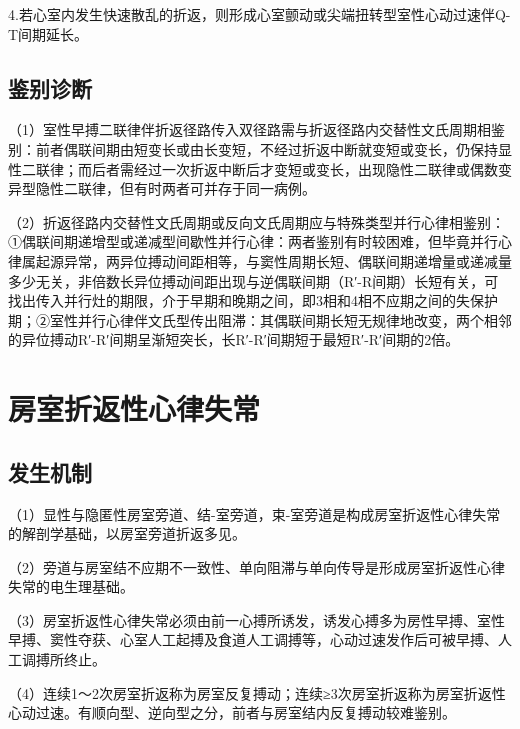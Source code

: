 4.若心室内发生快速散乱的折返，则形成心室颤动或尖端扭转型室性心动过速伴Q-T间期延长。

\protect\hypertarget{text00021.htmlux5cux23subid244}{}{}

\subsection{鉴别诊断}

（1）室性早搏二联律伴折返径路传入双径路需与折返径路内交替性文氏周期相鉴别：前者偶联间期由短变长或由长变短，不经过折返中断就变短或变长，仍保持显性二联律；而后者需经过一次折返中断后才变短或变长，出现隐性二联律或偶数变异型隐性二联律，但有时两者可并存于同一病例。

（2）折返径路内交替性文氏周期或反向文氏周期应与特殊类型并行心律相鉴别：①偶联间期递增型或递减型间歇性并行心律：两者鉴别有时较困难，但毕竟并行心律属起源异常，两异位搏动间距相等，与窦性周期长短、偶联间期递增量或递减量多少无关，非倍数长异位搏动间距出现与逆偶联间期（R′-R间期）长短有关，可找出传入并行灶的期限，介于早期和晚期之间，即3相和4相不应期之间的失保护期；②室性并行心律伴文氏型传出阻滞：其偶联间期长短无规律地改变，两个相邻的异位搏动R′-R′间期呈渐短突长，长R′-R′间期短于最短R′-R′间期的2倍。

\protect\hypertarget{text00021.htmlux5cux23subid245}{}{}

\section{房室折返性心律失常}

\protect\hypertarget{text00021.htmlux5cux23subid246}{}{}

\subsection{发生机制}

（1）显性与隐匿性房室旁道、结-室旁道，束-室旁道是构成房室折返性心律失常的解剖学基础，以房室旁道折返多见。

（2）旁道与房室结不应期不一致性、单向阻滞与单向传导是形成房室折返性心律失常的电生理基础。

（3）房室折返性心律失常必须由前一心搏所诱发，诱发心搏多为房性早搏、室性早搏、窦性夺获、心室人工起搏及食道人工调搏等，心动过速发作后可被早搏、人工调搏所终止。

（4）连续1～2次房室折返称为房室反复搏动；连续≥3次房室折返称为房室折返性心动过速。有顺向型、逆向型之分，前者与房室结内反复搏动较难鉴别。

\protect\hypertarget{text00021.htmlux5cux23subid247}{}{}

